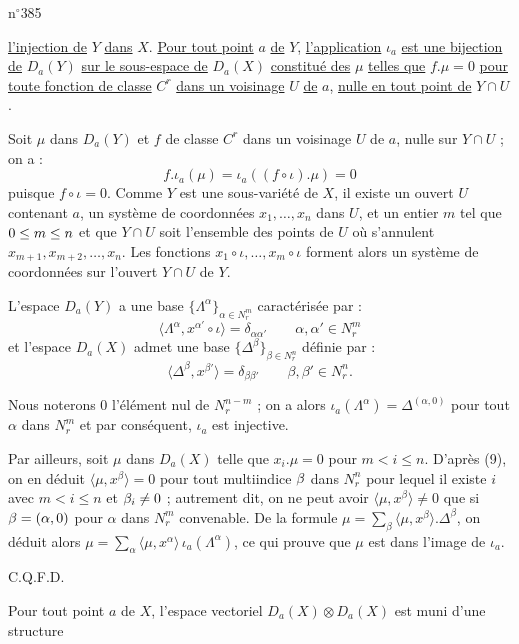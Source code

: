 
n$^{\circ}$385

\uline{l'injection de} $Y$ \uline{dans} $X$. \uline{Pour tout point} $a$ \uline{de} $Y$, \uline{l'application} $\iota_a$ \uline{est une bijection de} $D_a(Y)$ \uline{sur le sous-espace de} $D_a(X)$ \uline{constitué des} $\mu$ \uline{telles que} $f.\mu=0$ \uline{pour toute fonction de classe} $C^r$ \uline{dans un voisinage} $U$ \uline{de} $a$, \uline{nulle en tout point de} $Y\cap U$.

Soit $\mu$ dans $D_a(Y)$ et $f$ de classe $C^r$ dans un voisinage $U$ de $a$, nulle sur $Y\cap U$ ; on a :
\[
 f.\iota_a(\mu)=\iota_a((f\circ\iota).\mu)=0
\]
puisque $f\circ\iota=0$. Comme $Y$ est une sous-variété de $X$, il existe un ouvert $U$ contenant $a$, un système de coordonnées $x_1,\ldots,x_n$ dans $U$, et un entier $m$ tel que $0\leq m\leq n$ et que $Y\cap U$ soit l'ensemble des points de $U$ où s'annulent $x_{m+1},x_{m+2},\ldots,x_n$. Les fonctions $x_1\circ\iota,\ldots,x_m\circ\iota$ forment alors un système de coordonnées sur l'ouvert $Y\cap U$ de $Y$.

L'espace $D_a(Y)$ a une base $\{\Lambda^\alpha\}_{\alpha\in N_r^m}$ caractérisée par :
\[
 \langle\Lambda^\alpha,x^{\alpha'}\circ\iota\rangle=\delta_{\alpha\alpha'}\qquad \alpha,\alpha'\in N_r^m
\]
et l'espace $D_a(X)$ admet une base $\{\Delta^\beta\}_{\beta\in N_r^n}$ définie par :
\[
 \langle\Delta^\beta,x^{\beta'}\rangle=\delta_{\beta\beta'}\qquad \beta,\beta'\in N_r^n.
\]

Nous noterons $0$ l'élément nul de $N_r^{n-m}$ ; on a alors $\iota_a(\Lambda^\alpha)=\Delta^{(\alpha,0)}$ pour tout $\alpha$ dans $N_r^m$ et par conséquent, $\iota_a$ est injective.

Par ailleurs, soit $\mu$ dans $D_a(X)$ telle que $x_i.\mu=0$ pour $m<i\leq n$. D'après (9), on en déduit $\langle\mu,x^\beta\rangle=0$ pour tout multiindice $\beta$ dans $N_r^n$ pour lequel il existe $i$ avec $m<i\leq n$ et $\beta_i\ne 0$ ; autrement dit, on ne peut avoir $\langle\mu,x^\beta\rangle\ne 0$ que si $\beta=(\alpha,0)$ pour $\alpha$ dans $N_r^m$ convenable. De la formule $\mu=\sum\limits_\beta\langle\mu,x^\beta\rangle.\Delta^\beta$, on déduit alors $\mu=\sum\limits_\alpha\langle\mu,x^\alpha\rangle\,\iota_a(\Lambda^\alpha)$, ce qui prouve que $\mu$ est dans l'image de $\iota_a$.

\hfill C.Q.F.D.

Pour tout point $a$ de $X$, l'espace vectoriel $D_a(X)\otimes D_a(X)$ est muni d'une structure

